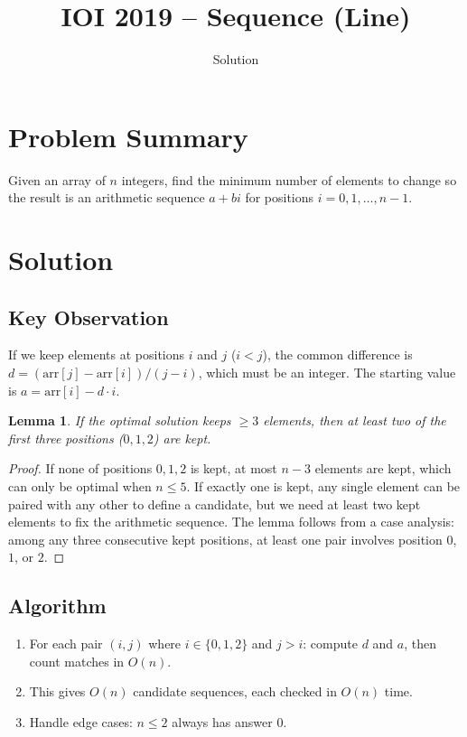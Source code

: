 \documentclass[11pt,a4paper]{article}
\title{IOI 2019 -- Sequence (Line)}
\author{Solution}
\date{}
\newtheorem{lemma}{Lemma}
\begin{document}
\maketitle

\section{Problem Summary}
Given an array of $n$ integers, find the minimum number of elements to change so the result is an arithmetic sequence $a + bi$ for positions $i = 0, 1, \ldots, n-1$.

\section{Solution}

\subsection{Key Observation}
If we keep elements at positions $i$ and $j$ ($i < j$), the common difference is $d = (\text{arr}[j] - \text{arr}[i]) / (j - i)$, which must be an integer. The starting value is $a = \text{arr}[i] - d \cdot i$.

\begin{lemma}
If the optimal solution keeps $\ge 3$ elements, then at least two of the first three positions ($0, 1, 2$) are kept.
\end{lemma}
\begin{proof}
If none of positions $0, 1, 2$ is kept, at most $n - 3$ elements are kept, which can only be optimal when $n \le 5$. If exactly one is kept, any single element can be paired with any other to define a candidate, but we need at least two kept elements to fix the arithmetic sequence. The lemma follows from a case analysis: among any three consecutive kept positions, at least one pair involves position $0$, $1$, or $2$.
\end{proof}

\subsection{Algorithm}
\begin{enumerate}
  \item For each pair $(i, j)$ where $i \in \{0, 1, 2\}$ and $j > i$: compute $d$ and $a$, then count matches in $O(n)$.
  \item This gives $O(n)$ candidate sequences, each checked in $O(n)$ time.
  \item Handle edge cases: $n \le 2$ always has answer $0$.
\end{enumerate}
\end{document}
